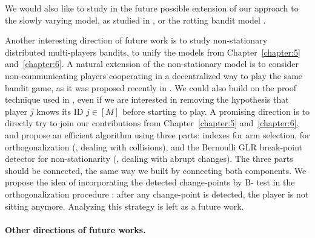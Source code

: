 We would also like to study in the future possible extension of our approach to the slowly varying model, as studied in \cite{Besbes14stochastic,Louedec16,WeiSrivastava18Abruptly}, or the rotting bandit model \cite{Seznec2018}.

Another interesting direction of future work is to study non-stationary distributed multi-players bandits, to unify the models from Chapter~\ref{chapter:5} and~\ref{chapter:6}.
A natural extension of the non-stationary model is to consider non-communicating players cooperating in a decentralized way to play the same bandit game, as it was proposed recently in \cite{WeiSrivastava18Distributed}.
%
We could also build on the proof technique used in \cite{WeiSrivastava18Abruptly}, even if we are interested in removing the hypothesis that player $j$ knows its ID $j\in[M]$ before starting to play.
%
A promising direction is to directly try to join our contributions from Chapter~\ref{chapter:5} and~\ref{chapter:6}, and propose an efficient algorithm using three parts:
\klUCB{} indexes for arm selection,
\MCTopM{} for orthogonalization (\ie, dealing with collisions),
and the Bernoulli GLR break-point detector for non-stationarity (\ie, dealing with abrupt changes).
The three parts should be connected, the same way we built \GLRklUCB{} by connecting both components.
We propose the idea of incorporating the detected change-points by B-\GLR{} test in the orthogonalization procedure \MCTopM: after any change-point is detected, the player is not sitting anymore.
Analyzing this strategy is left as a future work.



\paragraph{Other directions of future works.}

